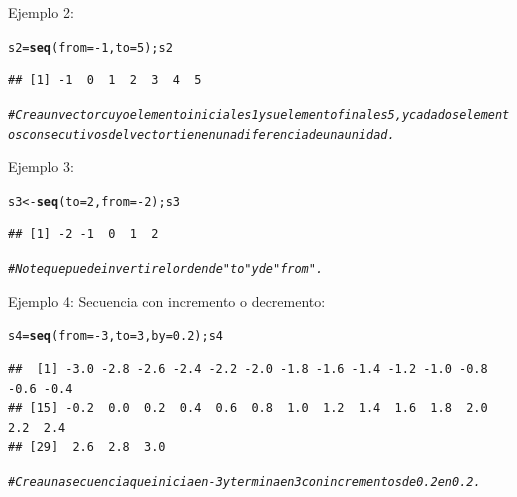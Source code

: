 \documentclass[12pt,letterpaper]{article}\usepackage[]{graphicx}\usepackage[]{color}
\makeatletter
\newcommand{\hlnum}[1]{\textcolor[rgb]{0.686,0.059,0.569}{#1}}%
\newcommand{\hlcom}[1]{\textcolor[rgb]{0.678,0.584,0.686}{\textit{#1}}}%
\newcommand{\hlopt}[1]{\textcolor[rgb]{0,0,0}{#1}}%
\newcommand{\hlstd}[1]{\textcolor[rgb]{0.345,0.345,0.345}{#1}}%
\newcommand{\hlkwb}[1]{\textcolor[rgb]{0.69,0.353,0.396}{#1}}%
\newcommand{\hlkwc}[1]{\textcolor[rgb]{0.333,0.667,0.333}{#1}}%
\newcommand{\hlkwd}[1]{\textcolor[rgb]{0.737,0.353,0.396}{\textbf{#1}}}%
\newenvironment{kframe}{%
 \def\at@end@of@kframe{}%
 \ifinner\ifhmode%
  \def\at@end@of@kframe{\end{minipage}}%
  \begin{minipage}{\columnwidth}%
 \fi\fi%
 \def\FrameCommand##1{\hskip\@totalleftmargin \hskip-\fboxsep
 \colorbox{shadecolor}{##1}\hskip-\fboxsep
     \hskip-\linewidth \hskip-\@totalleftmargin \hskip\columnwidth}%
 \MakeFramed {\advance\hsize-\width
   \@totalleftmargin\z@ \linewidth\hsize
   \@setminipage}}%
 {\par\unskip\endMakeFramed%
 \at@end@of@kframe}
\newenvironment{knitrout}{}{} %
\makeatother
\begin{document}
Ejemplo 2:
\begin{knitrout}
\color{fgcolor}\begin{kframe}
\begin{alltt}
\hlstd{s2} \hlkwb{=} \hlkwd{seq}\hlstd{(}\hlkwc{from}\hlstd{=}\hlopt{-}\hlnum{1}\hlstd{,} \hlkwc{to}\hlstd{=}\hlnum{5}\hlstd{); s2}
\end{alltt}
\begin{verbatim}
## [1] -1  0  1  2  3  4  5
\end{verbatim}
\begin{alltt}
\hlcom{# Crea un vector cuyo elemento inicial es 1 y su elemento final es 5, y cada dos elementos consecutivos del vector tienen una diferencia de una unidad.}
\end{alltt}
\end{kframe}
\end{knitrout}
Ejemplo 3:
\begin{knitrout}
\color{fgcolor}\begin{kframe}
\begin{alltt}
\hlstd{s3}\hlkwb{<-}\hlkwd{seq}\hlstd{(}\hlkwc{to}\hlstd{=}\hlnum{2}\hlstd{,} \hlkwc{from}\hlstd{=}\hlopt{-}\hlnum{2}\hlstd{); s3}
\end{alltt}
\begin{verbatim}
## [1] -2 -1  0  1  2
\end{verbatim}
\begin{alltt}
\hlcom{# Note que puede invertir el orden de "to" y de "from".}
\end{alltt}
\end{kframe}
\end{knitrout}
Ejemplo 4: Secuencia con incremento o decremento:
\begin{knitrout}
\color{fgcolor}\begin{kframe}
\begin{alltt}
\hlstd{s4}\hlkwb{=}\hlkwd{seq}\hlstd{(}\hlkwc{from}\hlstd{=}\hlopt{-}\hlnum{3}\hlstd{,} \hlkwc{to}\hlstd{=}\hlnum{3}\hlstd{,} \hlkwc{by}\hlstd{=}\hlnum{0.2}\hlstd{); s4}
\end{alltt}
\begin{verbatim}
##  [1] -3.0 -2.8 -2.6 -2.4 -2.2 -2.0 -1.8 -1.6 -1.4 -1.2 -1.0 -0.8 -0.6 -0.4
## [15] -0.2  0.0  0.2  0.4  0.6  0.8  1.0  1.2  1.4  1.6  1.8  2.0  2.2  2.4
## [29]  2.6  2.8  3.0
\end{verbatim}
\begin{alltt}
\hlcom{# Crea una secuencia que inicia en -3 y termina en 3 con incrementos de 0.2 en 0.2.}
\end{alltt}
\end{kframe}
\end{knitrout}
\end{document}

